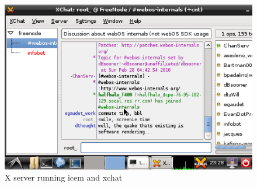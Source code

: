 \begin{figure}[tbh]
\centering
\includegraphics[width=1.0\columnwidth]{xchat1}
\caption{X server running icem and xchat}
\label{fig:x_screenie}
\end{figure}
